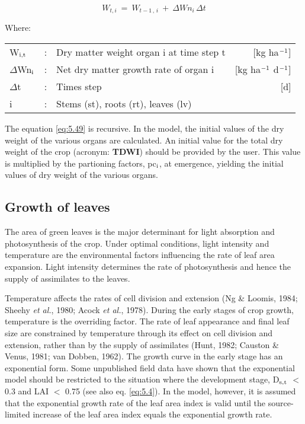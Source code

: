 \begin{equation}
\label{eq:5.49}
W _{t,i} ~=~W _{t-1\, ,\, i} ~+~\Delta Wn _{i} \,\Delta t
\end{equation}

Where:\\[5pt]
\begin{tabularx}{\textwidth}{llXr}
	W$_{{\rm i,t}}$ &:& Dry matter weight organ i at time step t   &
	[kg ha$^{{\rm -1}}$]\\
	$\Delta$Wn$_{{\rm i}}$ &:& Net dry matter growth rate of organ i   &
	[kg ha$^{{\rm -1}}$ d$^{{\rm -1}}$]\\
	$\Delta$t &:& Times step   &
	[d]\\
	i &:& Stems (st), roots (rt), leaves (lv)\\
\end{tabularx}

The equation \ref{eq:5.49} is recursive. In the model, the initial values of the dry weight of the
various organs are calculated. An initial value for the total dry weight of the crop
(acronym: {\bf TDWI}) should be provided by the user. This value is multiplied by the
partioning factors, pc$_{{\rm i}}$, at emergence, yielding the initial values of dry weight of the
various organs.

\subsection{Growth of leaves}
The area of green leaves is the major determinant for light absorption and photosynthesis
of the crop. Under optimal conditions, light intensity and temperature are the environmental factors influencing the rate of leaf area expansion. Light intensity determines the
rate of photosynthesis and hence the supply of assimilates to the leaves.

Temperature affects the rates of cell division and extension (Ng \& Loomis, 1984; Sheehy
{\it et al.}, 1980; Acock {\it et al.}, 1978). During the early stages of crop growth, temperature is
the overriding factor. The rate of leaf appearance and final leaf size are constrained by
temperature through its effect on cell division and extension, rather than by the supply of
assimilates (Hunt, 1982; Causton \& Venus, 1981; van Dobben, 1962). The growth curve
in the early stage has an exponential form. Some unpublished field data have shown that
the exponential model should be restricted to the situation where the development stage, 
D$_{{\rm s,t}}$ $<$ 0.3 and LAI $<$ 0.75 (see also eq. \ref{eq:5.4}). In the model, however, it is assumed that
the exponential growth rate of the leaf area index is valid until the source-limited increase
of the leaf area index equals the exponential growth rate.


